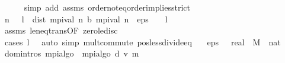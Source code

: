 \begin{isabellebody}
\ \ \ \ \isamarkupfalse%
\ {\isacharparenleft}{\kern0pt}simp\ add{\isacharcolon}{\kern0pt}\ assms\ order{\isachardot}{\kern0pt}not{\isacharunderscore}{\kern0pt}eq{\isacharunderscore}{\kern0pt}order{\isacharunderscore}{\kern0pt}implies{\isacharunderscore}{\kern0pt}strict{\isacharparenright}{\kern0pt}\isanewline
\ \ \isamarkupfalse%
\ {\isachardoublequoteopen}{\isasymexists}n{\isachardot}{\kern0pt}\ {\isacharparenleft}{\kern0pt}{}\ {\isacharasterisk}{\kern0pt}\ l{\isacharparenright}{\kern0pt}\ {\isacharasterisk}{\kern0pt}\ dist\ {\isacharparenleft}{\kern0pt}mpi{\isacharunderscore}{\kern0pt}val\ n{\isacharparenright}{\kern0pt}\ {\isacharparenleft}{\kern0pt}{\isasymL}\isactrlsub b\ {\isacharparenleft}{\kern0pt}mpi{\isacharunderscore}{\kern0pt}val\ n{\isacharparenright}{\kern0pt}{\isacharparenright}{\kern0pt}\ {\isacharless}{\kern0pt}\ eps\ {\isacharasterisk}{\kern0pt}\ {\isacharparenleft}{\kern0pt}{}\ {\isacharminus}{\kern0pt}\ l{\isacharparenright}{\kern0pt}{\isachardoublequoteclose}\isanewline
\ \ \ \ \isamarkupfalse%
\ assms\ le{\isacharunderscore}{\kern0pt}neq{\isacharunderscore}{\kern0pt}trans{\isacharbrackleft}{\kern0pt}OF\ zero{\isacharunderscore}{\kern0pt}le{\isacharunderscore}{\kern0pt}disc{\isacharbrackright}{\kern0pt}\isanewline
\ \ \ \ \isamarkupfalse%
\ {\isacharparenleft}{\kern0pt}cases\ {\isachardoublequoteopen}l\ {\isacharequal}{\kern0pt}\ {}{\isachardoublequoteclose}{\isacharparenright}{\kern0pt}\ {\isacharparenleft}{\kern0pt}auto\ simp{\isacharcolon}{\kern0pt}\ mult{\isachardot}{\kern0pt}commute\ pos{\isacharunderscore}{\kern0pt}less{\isacharunderscore}{\kern0pt}divide{\isacharunderscore}{\kern0pt}eq{\isacharparenright}{\kern0pt}\isanewline
{}\isamarkupfalse%
%
\endisatagproof
{\isafoldproof}%
%
\isadelimproof
\isanewline
%
\endisadelimproof
{}\isamarkupfalse%
%
\isadelimdocument
%
\endisadelimdocument
%
\isatagdocument
%
\isamarkuptrue%
%
\endisatagdocument
{\isafolddocument}%
%
\isadelimdocument
%
\endisadelimdocument
{}\isamarkupfalse%
\isanewline
\ \ \ eps\ {\isasymdelta}\ {\isacharcolon}{\kern0pt}{\isacharcolon}{\kern0pt}\ real\ \ M\ {\isacharcolon}{\kern0pt}{\isacharcolon}{\kern0pt}\ nat\isanewline
{}\isanewline
\isanewline
{}\isamarkupfalse%
\ {\isacharparenleft}{\kern0pt}domintros{\isacharparenright}{\kern0pt}\ mpi{\isacharunderscore}{\kern0pt}algo\ \ {\isachardoublequoteopen}mpi{\isacharunderscore}{\kern0pt}algo\ d\ v\ m\ {\isacharequal}{\kern0pt}\ {\isacharparenleft}{\kern0pt}\isanewline

\end{isabellebody}
